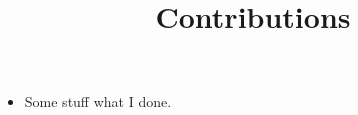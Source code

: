 \documentclass[a4paper]{article}
\title{Contributions}
\author{}
\date{}
\begin{document}
\maketitle

	\begin{itemize}
		\item Some stuff what I done.
	\end{itemize}
\end{document}
